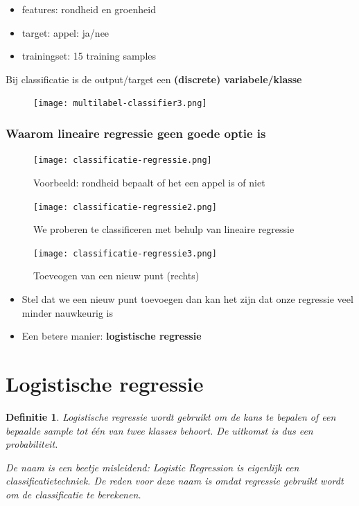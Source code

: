 \documentclass{article}
\newtheorem{theorem}{Definitie}[section]
\begin{document}
\begin{itemize}
    \item features: rondheid en groenheid
    \item target: appel: ja/nee
    \item trainingset: 15 training samples
\end{itemize}

Bij classificatie is de output/target een \textbf{(discrete) variabele/klasse}

\begin{figure}[H]
    \centering
    \texttt{[image: multilabel-classifier3.png]}
\end{figure}

\subsubsection{Waarom lineaire regressie geen goede optie is}

\begin{figure}[H]
    \centering
    \texttt{[image: classificatie-regressie.png]}
    \caption{Voorbeeld: rondheid bepaalt of het een appel is of niet}
\end{figure}

\begin{figure}[H]
    \centering
    \texttt{[image: classificatie-regressie2.png]}
    \caption{We proberen te classificeren met behulp van lineaire regressie}
\end{figure}

\begin{figure}[H]
    \centering
    \texttt{[image: classificatie-regressie3.png]}
    \caption{Toeveogen van een nieuw punt (rechts)}
\end{figure}

\begin{itemize}
    \item Stel dat we een nieuw punt toevoegen dan kan het zijn dat onze regressie veel minder nauwkeurig is
    \item Een betere manier: \textbf{logistische regressie}
\end{itemize}

\section{Logistische regressie}

\begin{theorem}
    Logistische regressie wordt gebruikt om de kans te bepalen of een bepaalde sample 
    tot één van twee klasses behoort. De uitkomst is dus een probabiliteit. 
    
    De naam is een beetje misleidend: Logistic Regression is eigenlijk een classificatietechniek. 
    De reden voor deze naam is omdat regressie gebruikt wordt om de classificatie te berekenen.
\end{theorem}
\end{document}
